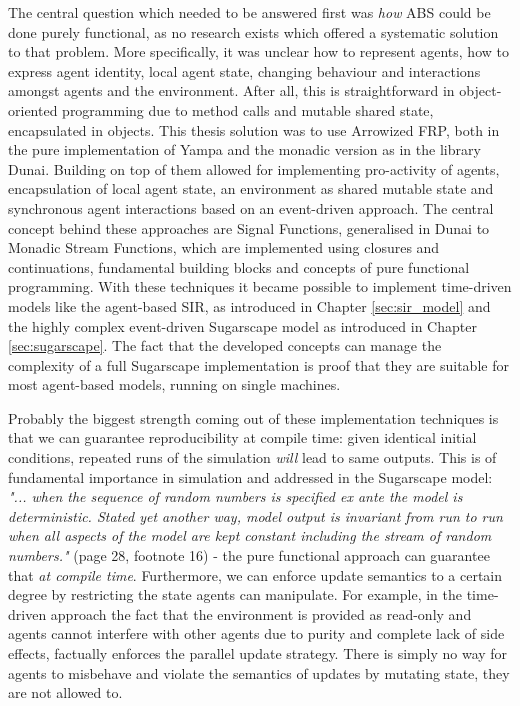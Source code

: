 The central question which needed to be answered first was \textit{how} ABS could be done purely functional, as no research exists which offered a systematic solution to that problem. More specifically, it was unclear how to represent agents, how to express agent identity, local agent state, changing behaviour and interactions amongst agents and the environment. After all, this is straightforward in object-oriented programming due to method calls and mutable shared state, encapsulated in objects. This thesis solution was to use Arrowized FRP, both in the pure implementation of Yampa and the monadic version as in the library Dunai. Building on top of them allowed for implementing pro-activity of agents, encapsulation of local agent state, an environment as shared mutable state and synchronous agent interactions based on an event-driven approach. The central concept behind these approaches are Signal Functions, generalised in Dunai to Monadic Stream Functions, which are implemented using closures and continuations, fundamental building blocks and concepts of pure functional programming. With these techniques it became possible to implement time-driven models like the agent-based SIR, as introduced in Chapter \ref{sec:sir_model} and the highly complex event-driven Sugarscape model as introduced in Chapter \ref{sec:sugarscape}. The fact that the developed concepts can manage the complexity of a full Sugarscape implementation is proof that they are suitable for most agent-based models, running on single machines. 

\medskip

Probably the biggest strength coming out of these implementation techniques is that we can guarantee reproducibility at compile time: given identical initial conditions, repeated runs of the simulation \textit{will} lead to same outputs. This is of fundamental importance in simulation and addressed in the Sugarscape model: \textit{"... when the sequence of random numbers is specified ex ante the model is deterministic. Stated yet another way, model output is invariant from run to run when all aspects of the model are kept constant including the stream of random numbers."} (page 28, footnote 16) - the pure functional approach can guarantee that \textit{at compile time}. Furthermore, we can enforce update semantics to a certain degree by restricting the state agents can manipulate. For example, in the time-driven approach the fact that the environment is provided as read-only and agents cannot interfere with other agents due to purity and complete lack of side effects, factually enforces the parallel update strategy. There is simply no way for agents to misbehave and violate the semantics of updates by mutating state, they are not allowed to.


